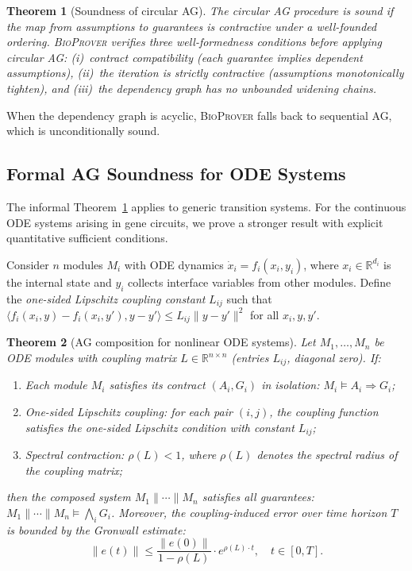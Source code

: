 \documentclass[11pt]{article}
\newtheorem{theorem}{Theorem}
\newcommand{\bioprover}{\textsc{BioProver}}
\newcommand{\RR}{\mathbb{R}}
\begin{document}
\begin{theorem}[Soundness of circular AG]
\label{thm:ag}
The circular AG procedure is sound if the map from assumptions to
guarantees is contractive under a well-founded ordering. \bioprover{}
verifies three well-formedness conditions before applying circular AG:
(i)~contract compatibility (each guarantee implies dependent
assumptions), (ii)~the iteration is strictly contractive (assumptions
monotonically tighten), and (iii)~the dependency graph has no
unbounded widening chains.
\end{theorem}

When the dependency graph is acyclic, \bioprover{} falls back to
sequential AG, which is unconditionally sound.

\subsection{Formal AG Soundness for ODE Systems}

The informal Theorem~\ref{thm:ag} applies to generic transition
systems. For the continuous ODE systems arising in gene circuits, we
prove a stronger result with explicit quantitative sufficient
conditions.

Consider $n$ modules $M_i$ with ODE dynamics
$\dot{x}_i = f_i(x_i, y_i)$, where $x_i \in \RR^{d_i}$ is the
internal state and $y_i$ collects interface variables from other
modules. Define the \emph{one-sided Lipschitz coupling constant}
$L_{ij}$ such that
$\langle f_i(x_i, y) - f_i(x_i, y'), y - y'\rangle \leq L_{ij}
\|y - y'\|^2$ for all $x_i, y, y'$.

\begin{theorem}[AG composition for nonlinear ODE systems]
\label{thm:ag-formal}
Let $M_1, \ldots, M_n$ be ODE modules with coupling matrix
$L \in \RR^{n \times n}$ (entries $L_{ij}$, diagonal zero). If:
\begin{enumerate}[itemsep=1pt]
\item[(C1)] Each module $M_i$ satisfies its contract $(A_i, G_i)$
  in isolation: $M_i \models A_i \Rightarrow G_i$;
\item[(C2)] One-sided Lipschitz coupling: for each pair $(i,j)$,
  the coupling function satisfies the one-sided Lipschitz condition
  with constant $L_{ij}$;
\item[(C3)] Spectral contraction: $\rho(L) < 1$, where $\rho(L)$
  denotes the spectral radius of the coupling matrix;
\end{enumerate}
then the composed system $M_1 \| \cdots \| M_n$ satisfies all
guarantees: $M_1 \| \cdots \| M_n \models \bigwedge_i G_i$.
Moreover, the coupling-induced error over time horizon $T$ is
bounded by the Gronwall estimate:
\begin{equation}
\label{eq:coupling-error}
\|e(t)\| \leq \frac{\|e(0)\|}{1 - \rho(L)} \cdot
  e^{\rho(L) \cdot t}, \quad t \in [0, T].
\end{equation}
\end{theorem}
\end{document}
